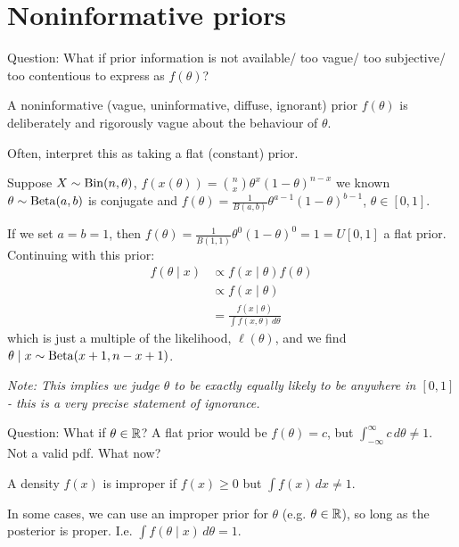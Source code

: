 \documentclass[10pt, a4paper]{article}
\begin{document}
\newpage

\section{Noninformative priors}
Question:
What if prior information is not available/
too vague/
too subjective/
too contentious to express as $f(\theta)$?

\begin{definition}
    A noninformative
    (vague,
    uninformative,
    diffuse,
    ignorant)
    prior $f(\theta)$ is deliberately and rigorously vague about the behaviour of $\theta$.
\end{definition}

Often,
interpret this as taking a flat
(constant)
prior.

\begin{example}
    Suppose $X \sim \operatorname{Bin}(n, \theta)$,
    $f(x(\theta)) = \binom{n}{x}\theta ^ x(1 - \theta) ^ {n - x}$ we known $\theta \sim \operatorname{Beta}(a, b)$ is conjugate and $f(\theta) = \frac{1}{B(a, b)}\theta ^ {a - 1}(1 - \theta) ^ {b - 1}$,
    $\theta \in [0, 1]$.
\end{example}

If we set $a = b = 1$,
then $f(\theta) = \frac{1}{B(1, 1)}\theta ^ 0(1 - \theta) ^ 0 = 1 = U[0, 1]$ a flat prior.
Continuing with this prior:
\begin{align*}
    f(\theta \mid x) &\propto f(x \mid \theta)f(\theta) \\
    &\propto f(x \mid \theta) \\
    &= \frac{f(x \mid \theta)}{\int f(x, \theta)\,d\theta}
\end{align*}
which is just a multiple of the likelihood,
$\ell(\theta)$,
and we find $\theta \mid x \sim \operatorname{Beta}(x + 1, n - x + 1)$.

\textit{Note:
This implies we judge $\theta$ to be exactly equally likely to be anywhere in $[0, 1]$ -
this is a very precise statement of ignorance.}

Question:
What if $\theta \in \mathbb{R}$?
A flat prior would be $f(\theta) = c$,
but $\int_{-\infty}^{\infty}c\,d\theta \neq 1$.
Not a valid pdf.
What now?
\begin{definition}
    A density $f(x)$ is improper if $f(x) \geq 0$ but $\int f(x)\,dx \neq 1$.
\end{definition}

In some cases,
we can use an improper prior for $\theta$
(e.g. $\theta \in \mathbb{R}$),
so long as the posterior is proper.
I.e. $\int f(\theta \mid x)\,d\theta = 1$.
\end{document}
